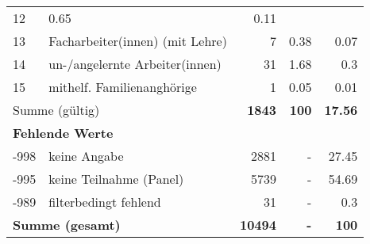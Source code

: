 \begin{longtable}{lXrrr}
       \num{12} &
       \num[round-mode=places,round-precision=2]{0,65} &
         \num[round-mode=places,round-precision=2]{0,11} \\

     13 &
     \multicolumn{1}{X}{ Facharbeiter(innen) (mit Lehre)   } &


       \num{7} &
       \num[round-mode=places,round-precision=2]{0,38} &
         \num[round-mode=places,round-precision=2]{0,07} \\

     14 &
     \multicolumn{1}{X}{ un-/angelernte Arbeiter(innen)   } &


       \num{31} &
       \num[round-mode=places,round-precision=2]{1,68} &
         \num[round-mode=places,round-precision=2]{0,3} \\

     15 &
     \multicolumn{1}{X}{ mithelf. Familienanghörige   } &


       \num{1} &
       \num[round-mode=places,round-precision=2]{0,05} &
         \num[round-mode=places,round-precision=2]{0,01} \\
     \midrule
     \multicolumn{2}{l}{Summe (gültig)} &
       \textbf{\num{1843}} &
     \textbf{100} &
       \textbf{\num[round-mode=places,round-precision=2]{17,56}} \\
     \multicolumn{5}{l}{\textbf{Fehlende Werte}}\\
       -998 &
       keine Angabe &
         \num{2881} &
        - &
         \num[round-mode=places,round-precision=2]{27,45} \\
       -995 &
       keine Teilnahme (Panel) &
         \num{5739} &
        - &
         \num[round-mode=places,round-precision=2]{54,69} \\
       -989 &
       filterbedingt fehlend &
         \num{31} &
        - &
         \num[round-mode=places,round-precision=2]{0,3} \\
     \midrule
     \multicolumn{2}{l}{\textbf{Summe (gesamt)}} &
          \textbf{\num{10494}} &
        \textbf{-} &
        \textbf{100} \\
     \bottomrule
     \end{longtable}
     
